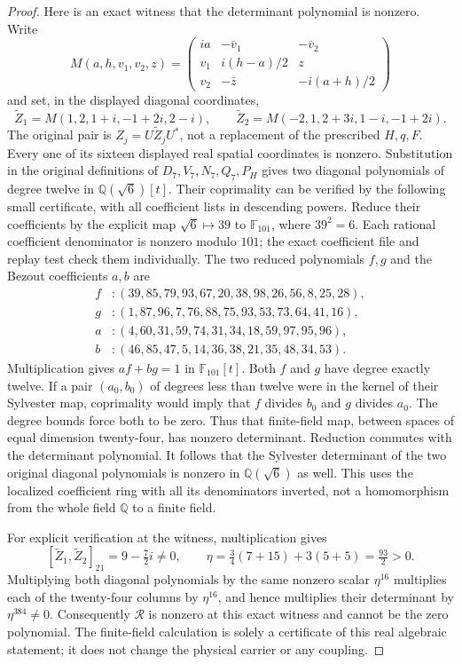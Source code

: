 \begin{proof}
Here is an exact witness that the determinant polynomial is nonzero.
Write
\[
 M(a,h,v_1,v_2,z)=
 \begin{pmatrix}
 ia&-\bar v_1&-\bar v_2\\
 v_1&i(h-a)/2&z\\
 v_2&-\bar z&-i(a+h)/2
 \end{pmatrix}
\]
and set, in the displayed diagonal coordinates,
\[
 \widetilde Z_1=M(1,2,1+i,-1+2i,2-i),\qquad
 \widetilde Z_2=M(-2,1,2+3i,1-i,-1+2i).
\]
The original pair is $Z_j=U\widetilde Z_jU^*$, not a replacement
of the prescribed $H,q,F$. Every one of its sixteen displayed real
spatial coordinates is nonzero. Substitution in the original definitions
of $D_7,V_7,N_7,Q_7,P_H$ gives two diagonal polynomials of degree
twelve in $\mathbb Q(\sqrt6)[t]$. Their coprimality can be verified
by the following small certificate, with all coefficient lists in
descending powers. Reduce their coefficients by the explicit map
$\sqrt6\mapsto39$ to $\mathbb F_{101}$, where $39^2=6$.
Each rational coefficient denominator is nonzero modulo $101$;
the exact coefficient file and replay test check them individually.
The two reduced polynomials $f,g$ and the Bezout coefficients $a,b$ are
\begin{align*}
 f &: (39,85,79,93,67,20,38,98,26,56,8,25,28),\\
 g &: (1,87,96,7,76,88,75,93,53,73,64,41,16),\\
 a &: (4,60,31,59,74,31,34,18,59,97,95,96),\\
 b &: (46,85,47,5,14,36,38,21,35,48,34,53).
\end{align*}
Multiplication gives $af+bg=1$ in $\mathbb F_{101}[t]$.
Both $f$ and $g$ have degree exactly twelve. If a pair
$(a_0,b_0)$ of degrees less than twelve were in the kernel of their
Sylvester map, coprimality would imply that $f$ divides $b_0$ and
$g$ divides $a_0$. The degree bounds force both to be zero. Thus that
finite-field map, between spaces of equal dimension twenty-four, has
nonzero determinant. Reduction commutes with the determinant polynomial.
It follows that the Sylvester determinant of the two original diagonal
polynomials is nonzero in $\mathbb Q(\sqrt6)$ as well. This uses
the localized coefficient ring with all its denominators inverted,
not a homomorphism from the whole field $\mathbb Q$ to a finite field.

For explicit verification at the witness, multiplication gives
\[
 [\widetilde Z_1,\widetilde Z_2]_{21}=9-\tfrac72 i\ne0,\qquad
 \eta=\tfrac34(7+15)+3(5+5)=\tfrac{93}2>0.
\]
Multiplying both diagonal polynomials by the same nonzero scalar
$\eta^{16}$ multiplies each of the twenty-four columns by
$\eta^{16}$, and hence multiplies their determinant by
$\eta^{384}\ne0$. Consequently $\mathscr R$ is nonzero at
this exact witness and cannot be the zero polynomial. The finite-field
calculation is solely a certificate of this real algebraic statement;
it does not change the physical carrier or any coupling.


\end{proof}
